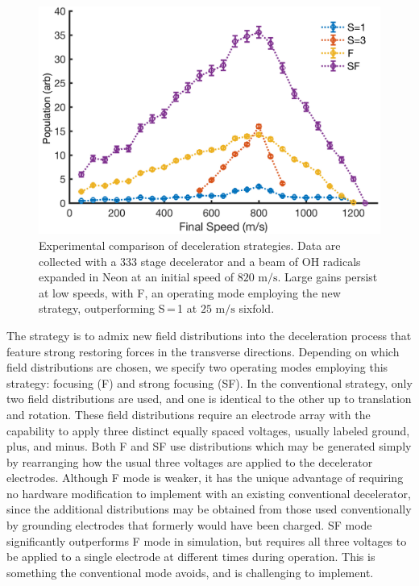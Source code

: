 \documentclass[%
 reprint,
 amsmath,amssymb,
 aps,
prl,
]{revtex4-1}
\begin{document}
\begin{figure}[t]
\includegraphics[width=\linewidth]{Data/Data-Figure-Final-Speed.png}%
\vspace{-5pt}
\caption{\label{fig:alldata}
Experimental comparison of deceleration strategies. 
Data are collected with a $333$ stage decelerator and a beam of OH radicals expanded in Neon at an initial speed of $820\text{ m/s}$. 
Large gains persist at low speeds, with F, an operating mode employing the new strategy, outperforming S\,=\,1 at $25\text{ m/s}$ sixfold.
\vspace{-4mm}
}
\end{figure}


The strategy is to admix new field distributions into the deceleration process that feature strong restoring forces in the transverse directions.
Depending on which field distributions are chosen, we specify two operating modes employing this strategy: focusing (F) and strong focusing (SF).
In the conventional strategy, only two field distributions are used, and one is identical to the other up to translation and rotation.
These field distributions require an electrode array with the capability to apply three distinct equally spaced voltages, usually labeled ground, plus, and minus.
Both F and SF use distributions which may be generated simply by rearranging how the usual three voltages are applied to the decelerator electrodes.
Although F mode is weaker, it has the unique advantage of requiring no hardware modification to implement with an existing conventional decelerator, since the additional distributions may be obtained from those used conventionally by grounding electrodes that formerly would have been charged.
SF mode significantly outperforms F mode in simulation, but requires all three voltages to be applied to a single electrode at different times during operation.
This is something the conventional mode avoids, and is challenging to implement.
\end{document}

